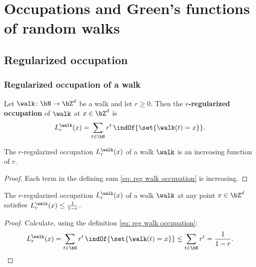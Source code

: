 \chapter{Occupations and Green's functions of random walks}



\section{Regularized occupation}


\subsection*{Regularized occupation of a walk}

\begin{definition}
  \label{def:walkRegOccup}
  \leanok
  Let $\walk \colon \bN \to \bZ^d$ be a walk and let $r \ge 0$.
  Then the \textbf{$r$-regularized occupation}
  of $\walk$ at $x \in \bZ^d$ is
  \begin{align}\label{eq: reg walk occupation}
  L^{\walk}_r(x) = \sum_{t \in \bN} r^t \, \indOf{\set{\walk(t) = x}} .
  \end{align}
\end{definition}

\begin{lemma}
  \label{lem:walkRegOccup_incr}
  The $r$-regularized occupation $L^{\walk}_r(x)$
  of a walk $\walk$ is an increasing
  function of $r$.
\end{lemma}
\begin{proof}
Each term in the defining sum \eqref{eq: reg walk occupation}
is increasing.
\end{proof}

\begin{lemma}
  \label{lem:walk_regOcc_geometric_bound}
  The $r$-regularized occupation $L^{\walk}_r(x)$
  of a walk $\walk$ at any point $x \in \bZ^d$
  satisfies $L^{\walk}_r(x) \le \frac{1}{1-r}$.
\end{lemma}
\begin{proof}
Calculate, using the definition \eqref{eq: reg walk occupation}:
\begin{align*}
L^{\walk}_r(x) = \sum_{t \in \bN} r^t \, \indOf{\set{\walk(t) = x}}
    \le \sum_{t \in \bN} r^t = \frac{1}{1-r}.
\end{align*}
\end{proof}

